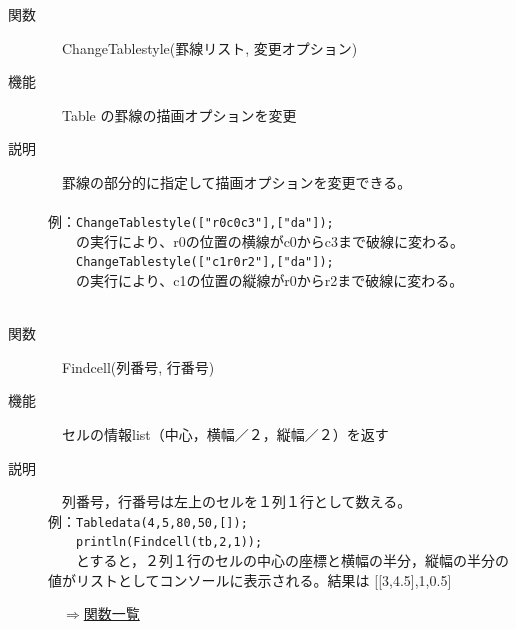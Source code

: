 \documentclass[papersize,a4paper,12pt,uplatex]{jsarticle}
\begin{document}
\begin{description}
%
%
\hypertarget{changetablestyle}{}
\item[関数]　ChangeTablestyle(罫線リスト, 変更オプション)
\item[機能]　Table の罫線の描画オプションを変更
\item[説明]　罫線の部分的に指定して描画オプションを変更できる。\\
　\\
例：\verb|ChangeTablestyle(["r0c0c3"],["da"]);| \\
　　の実行により、r0の位置の横線がc0からc3まで破線に変わる。\\
　　\verb|ChangeTablestyle(["c1r0r2"],["da"]);|\\
　　の実行により、c1の位置の縦線がr0からr2まで破線に変わる。\\
　\\
\hypertarget{findcell}{}
\item[関数]　Findcell(列番号, 行番号)
\item[機能]　セルの情報list（中心，横幅／２，縦幅／２）を返す
\item[説明]　列番号，行番号は左上のセルを１列１行として数える。　\\

例：\verb|Tabledata(4,5,80,50,[]);|\\
　　\verb|println(Findcell(tb,2,1));|\\
　　とすると，２列１行のセルの中心の座標と横幅の半分，縦幅の半分の値がリストとしてコンソールに表示される。結果は [[3,4.5],1,0.5]\\ 

\begin{flushright}　\hyperlink{functionlist}{$\Rightarrow$関数一覧}\end{flushright}


\end{description}
\end{document}
